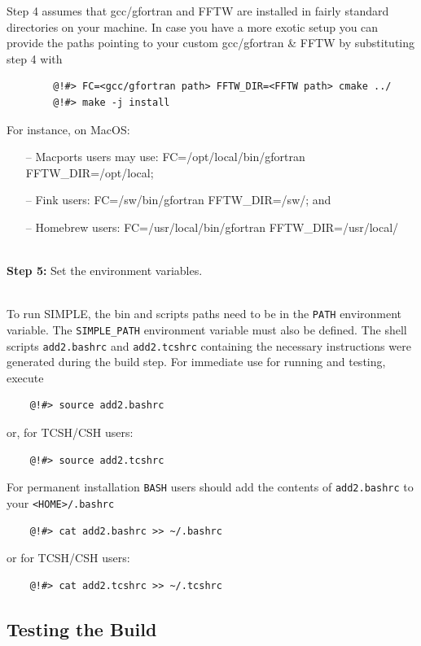 \documentclass[a4paper,11pt]{article}
\begin{document}
\noindent{}Step 4 assumes that gcc/gfortran and FFTW are installed in fairly standard directories on your machine. In case you have a 
more exotic setup you can provide the paths pointing to your custom gcc/gfortran \& FFTW by substituting step 4 with

\begin{verbatim}
        @!#> FC=<gcc/gfortran path> FFTW_DIR=<FFTW path> cmake ../
        @!#> make -j install
\end{verbatim}

\noindent{}For instance, on MacOS:
\begin{itemize}
	\item[--] Macports users may use: FC=/opt/local/bin/gfortran FFTW\_DIR=/opt/local;
	\item[--] Fink users: FC=/sw/bin/gfortran FFTW\_DIR=/sw/; and
	\item[--] Homebrew users: FC=/usr/local/bin/gfortran FFTW\_DIR=/usr/local/
\end{itemize}

\noindent{}\\\textbf{Step 5:} Set the environment variables.

\noindent{}\\To run SIMPLE, the bin and scripts paths need to be in the \texttt{PATH} environment
variable. The \texttt{SIMPLE\_PATH} environment variable must also be defined. The 
shell scripts \texttt{add2.bashrc} and \texttt{add2.tcshrc} containing the necessary
instructions were generated during the build step. For immediate use for running and testing, execute
\begin{verbatim}
    @!#> source add2.bashrc
\end{verbatim}
\noindent{}or, for TCSH/CSH users:
\begin{verbatim}
    @!#> source add2.tcshrc
\end{verbatim}

\noindent{}For permanent installation \texttt{BASH} users should add the contents of \texttt{add2.bashrc} to your \texttt{<HOME>/.bashrc}
\begin{verbatim}
    @!#> cat add2.bashrc >> ~/.bashrc
\end{verbatim}
\noindent{}or for TCSH/CSH users:
\begin{verbatim}
    @!#> cat add2.tcshrc >> ~/.tcshrc
\end{verbatim}

\subsection{Testing the Build}
\end{document}
